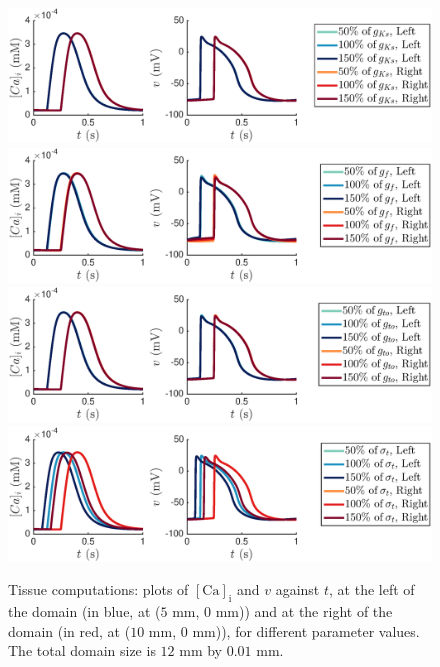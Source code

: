 \documentclass{article}
\begin{document}
%
\begin{figure}
   \includegraphics[trim=3cm 0cm 4cm 0cm, clip=true, width=1\linewidth]{strip_gks} 
   \includegraphics[trim=3cm 0cm 4cm 0cm, clip=true, width=1\linewidth]{strip_gf} 
      \includegraphics[trim=3cm 0cm 4cm 0cm, clip=true, width=1\linewidth]{strip_gto} 
         \includegraphics[trim=3cm 0cm 4cm 0cm, clip=true, width=1\linewidth]{strip_sigmat} 
    \caption{Tissue computations: plots of $[\mathrm{Ca}]_{\mathrm{i}}$ and $v$ against $t$, at the left of the domain (in blue, at ($5$ mm, $0$ mm)) and at the right of the domain (in red, at ($10$ mm, $0$ mm)), for different parameter values. The total domain size is $12$ mm by $0.01$ mm.}
    \label{fig:5}
\end{figure}
%
\end{document}
